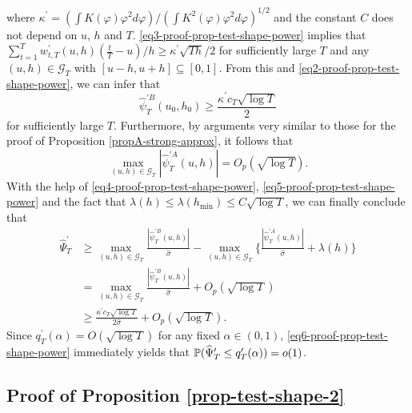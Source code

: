 \documentclass[a4paper,12pt]{article}
\begin{document}
where $\kappa^\prime = (\int K(\varphi) \varphi^2 d\varphi) / (\int K^2(\varphi) \varphi^2 d\varphi)^{1/2}$ and the constant $C$ does not depend on $u$, $h$ and $T$. \eqref{eq3-proof-prop-test-shape-power} implies that $\sum\nolimits_{t=1}^T w_{t,T}^\prime(u,h) (\frac{t}{T} - u)/h \ge \kappa^\prime \sqrt{Th} / 2$ for sufficiently large $T$ and any $(u,h) \in \mathcal{G}_T$ with $[u-h,u+h] \subseteq [0,1]$. From this and \eqref{eq2-proof-prop-test-shape-power}, we can infer that 
\begin{equation}\label{eq4-proof-prop-test-shape-power}
\widehat{\psi}_T^{\prime B}(u_0,h_0) \ge \frac{\kappa^\prime c_T \sqrt{\log T}}{2} 
\end{equation}
for sufficiently large $T$. Furthermore, by arguments very similar to those for the proof of Proposition \ref{propA-strong-approx}, it follows that
\begin{equation}\label{eq5-proof-prop-test-shape-power}
\max_{(u,h) \in \mathcal{G}_T} |\widehat{\psi}_T^{\prime A}(u,h)| = O_p(\sqrt{\log T}). 
\end{equation}
With the help of \eqref{eq4-proof-prop-test-shape-power}, \eqref{eq5-proof-prop-test-shape-power} and the fact that $\lambda(h) \le \lambda(h_{\min}) \le C \sqrt{\log T}$, we can finally conclude that
\begin{align}
\widehat{\Psi}_T^\prime 
 & \ge \max_{(u,h) \in \mathcal{G}_T} \frac{|\widehat{\psi}_T^{\prime B}(u,h)|}{\widehat{\sigma}} - \max_{(u,h) \in \mathcal{G}_T} \Big\{ \frac{|\widehat{\psi}_T^{\prime A}(u,h)|}{\widehat{\sigma}} + \lambda(h) \Big\} \nonumber \\
 & = \max_{(u,h) \in \mathcal{G}_T} \frac{|\widehat{\psi}_T^{\prime B}(u,h)|}{\widehat{\sigma}} + O_p(\sqrt{\log T}) \nonumber \\
 & \ge \frac{\kappa^\prime c_T \sqrt{\log T}}{2 \widehat{\sigma}} + O_p(\sqrt{\log T}). \label{eq6-proof-prop-test-shape-power}
\end{align}  
Since $q_T^\prime(\alpha) = O(\sqrt{\log T})$ for any fixed $\alpha \in (0,1)$, \eqref{eq6-proof-prop-test-shape-power} immediately yields that $\mathbb{P}(\widehat{\Psi}_T^\prime \le q_T^\prime(\alpha)) = o(1)$. 



\subsection*{Proof of Proposition \ref{prop-test-shape-2}}
\end{document}
